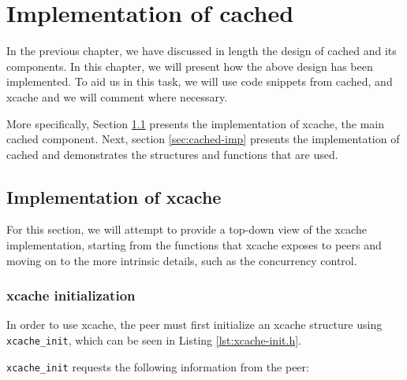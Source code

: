 \chapter{Implementation of cached}\label{ch:cached-implementation}

In the previous chapter, we have discussed in length the design of cached and 
its components. In this chapter, we will present how the above design has been
implemented. To aid us in this task, we will use code snippets from cached, and 
xcache and we will comment where necessary.

More specifically, Section \ref{sec:xcache-imp} presents the implementation of 
xcache, the main cached component. Next, section \ref{sec:cached-imp} presents 
the implementation of cached and demonstrates the structures and functions that 
are used.

\section{Implementation of xcache}\label{sec:xcache-imp}

For this section, we will attempt to provide a top-down view of the xcache 
implementation, starting from the functions that xcache exposes to peers and 
moving on to the more intrinsic details, such as the concurrency control.

\subsection{xcache initialization}

In order to use xcache, the peer must first initialize an xcache structure 
using \texttt{xcache\_init}, which can be seen in Listing 
\ref{lst:xcache-init.h}.


\texttt{xcache\_init} requests the following information from the peer:

